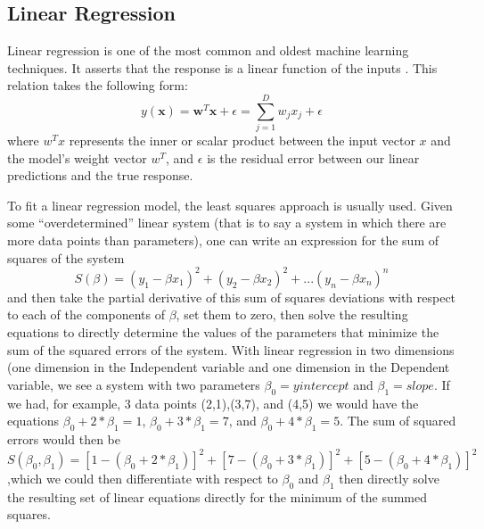 \subsection{Linear Regression}
Linear regression is one of the most common and oldest machine learning
techniques. It asserts that the response is a linear function
of the inputs \cite{Murphy}. This relation takes the following form:
$$ y(\textbf{x}) = \textbf{w}^T\textbf{x} + \epsilon = \sum_{j=1}^{D}w_jx_j + \epsilon $$
where $w^Tx$ represents the inner or scalar product between the input vector $x$
and the model's weight vector $w^T$, and $\epsilon$ is the residual error
between our linear predictions and the true response.

To fit a linear regression model, the least squares approach is usually used.
Given some  ``overdetermined'' linear system (that is to say a system in which
there are more data points than parameters), one can write an expression for the
sum of squares of the system
$$S(\beta) = (y_1 - \beta x_1)^2 + (y_2 - \beta x_2)^2 + ... (y_n - \beta x_n)^n$$
and then take the partial derivative of this sum of squares deviations with respect
to each of the components of $\beta$, set them to zero, then solve the resulting
equations to directly determine the values of the parameters that
minimize the sum of the squared errors of the system. With linear regression in
two dimensions (one dimension in the Independent variable and one dimension in
the Dependent variable, we see a system with two parameters
$\beta_0 = y intercept$ and $\beta_1 = slope$. If we had, for example, 3 data
points (2,1),(3,7), and (4,5) we would have the equations
$\beta_0 + 2*\beta_1 = 1$, $\beta_0 + 3*\beta_1 = 7$, and
$\beta_0 + 4*\beta_1 = 5$. The sum of squared errors would then be
 $S(\beta_0,\beta_1)= [1 - (\beta_0 + 2*\beta_1)]^2 + [7 - (\beta_0 + 3*\beta_1)]^2 + [5 - (\beta_0 + 4*\beta_1)]^2$
,which we could then differentiate with respect to $\beta_0$ and $\beta_1$ then
directly solve the resulting set of linear equations directly for the minimum of
the summed squares.
